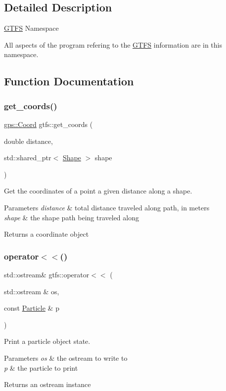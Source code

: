 \subsection{Detailed Description}
\hyperlink{classgtfs_1_1GTFS}{G\+T\+FS} Namespace

All aspects of the program refering to the \hyperlink{classgtfs_1_1GTFS}{G\+T\+FS} information are in this namespace. 

\subsection{Function Documentation}
\mbox{\label{namespacegtfs_af4dc0313dc585ab27351aac9bfca32f6}} 
\subsubsection{\texorpdfstring{get\+\_\+coords()}{get\_coords()}}
{\footnotesize\ttfamily \hyperlink{classgps_1_1Coord}{gps\+::\+Coord} gtfs\+::get\+\_\+coords (\begin{DoxyParamCaption}\item[{double}]{distance,  }\item[{std\+::shared\+\_\+ptr$<$ \hyperlink{classgtfs_1_1Shape}{Shape} $>$}]{shape }\end{DoxyParamCaption})}

Get the coordinates of a point a given distance along a shape. 
\begin{DoxyParams}{Parameters}
{\em distance} & total distance traveled along path, in meters \\
\hline
{\em shape} & the shape path being traveled along \\
\hline
\end{DoxyParams}
\begin{DoxyReturn}{Returns}
a coordinate object 
\end{DoxyReturn}
\mbox{\label{namespacegtfs_a3a0b93a57343e447187095cfbbf0af9a}} 
\subsubsection{\texorpdfstring{operator$<$$<$()}{operator<<()}}
{\footnotesize\ttfamily std\+::ostream\& gtfs\+::operator$<$$<$ (\begin{DoxyParamCaption}\item[{std\+::ostream \&}]{os,  }\item[{const \hyperlink{classgtfs_1_1Particle}{Particle} \&}]{p }\end{DoxyParamCaption})\hspace{0.3cm}{\ttfamily [inline]}}

Print a particle object state. 
\begin{DoxyParams}{Parameters}
{\em os} & the ostream to write to \\
\hline
{\em p} & the particle to print \\
\hline
\end{DoxyParams}
\begin{DoxyReturn}{Returns}
an ostream instance 
\end{DoxyReturn}
